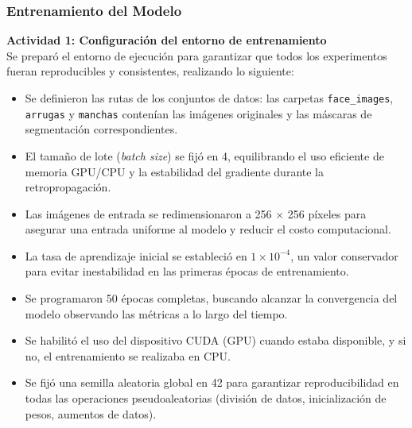 \subsubsection{Entrenamiento del Modelo}
\textbf{Actividad 1: Configuración del entorno de entrenamiento} \\
Se preparó el entorno de ejecución para garantizar que todos los experimentos fueran reproducibles y consistentes, realizando lo siguiente:
\begin{itemize}
\item Se definieron las rutas de los conjuntos de datos: las carpetas \texttt{face\_images}, \texttt{arrugas} y \texttt{manchas} contenían las imágenes originales y las máscaras de segmentación correspondientes.
\item El tamaño de lote (\emph{batch size}) se fijó en 4, equilibrando el uso eficiente de memoria GPU/CPU y la estabilidad del gradiente durante la retropropagación.
\item Las imágenes de entrada se redimensionaron a 256 $\times$ 256 píxeles para asegurar una entrada uniforme al modelo y reducir el costo computacional.
\item La tasa de aprendizaje inicial se estableció en $1 \times 10^{-4}$, un valor conservador para evitar inestabilidad en las primeras épocas de entrenamiento.
\item Se programaron 50 épocas completas, buscando alcanzar la convergencia del modelo observando las métricas a lo largo del tiempo.
\item Se habilitó el uso del dispositivo CUDA (GPU) cuando estaba disponible, y si no, el entrenamiento se realizaba en CPU.
\item Se fijó una semilla aleatoria global en 42 para garantizar reproducibilidad en todas las operaciones pseudoaleatorias (división de datos, inicialización de pesos, aumentos de datos).
\end{itemize}

